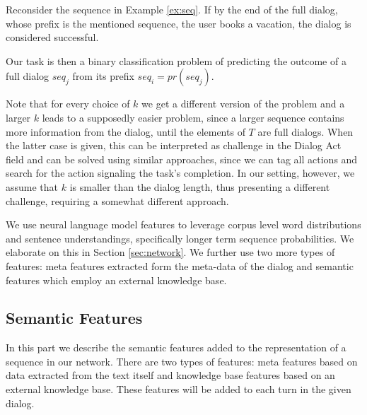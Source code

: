 \begin{example}
Reconsider the sequence in Example \ref{ex:seq}.  
If by the end of the full dialog, whose prefix is the mentioned sequence, 
the user books a vacation, the dialog is considered successful.
\end{example}


Our task is then a binary classification 
problem of predicting the outcome 
of a full dialog $seq_j$ from its prefix $seq_i = pr(seq_j)$. 

Note that for every choice of $k$ we get a different 
version of the problem and a larger $k$ leads 
to a supposedly easier problem, since a larger sequence contains 
more information from the dialog, until the elements of $T$ 
are full dialogs. When the latter case is 
given, this can be interpreted as challenge in the Dialog Act field \cite{cs-CL-0006023,DBLP:conf/icassp/JiB05,DBLP:conf/coling/WermterL96} and can be solved using similar approaches, since we 
can tag all actions and search for the action signaling the task's completion. 
In our setting, however, we assume that $k$ is smaller than the dialog 
length, thus presenting a different challenge, requiring a somewhat different approach. 

We use neural language model features to leverage corpus
level word distributions and sentence understandings, 
specifically longer term
sequence probabilities. 
We elaborate on this in Section \ref{sec:network}. 
We further use two more types of features: meta features 
extracted form the meta-data of the dialog and semantic features 
which employ an external knowledge base.


\subsection{Semantic Features}\label{sec:sem} 
In this part we describe the semantic features added 
to the representation of a sequence in our network. 
There are two types of features: meta features based on 
data extracted from the text itself and knowledge base features 
based on an external knowledge base. 
These features will be added to each turn in the given dialog. 


